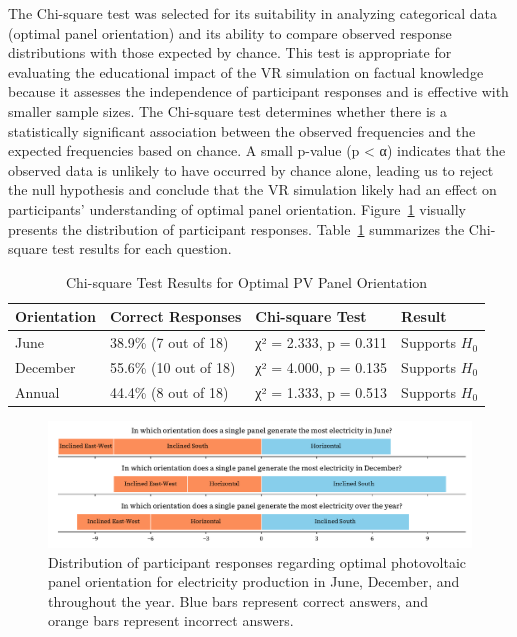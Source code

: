\documentclass[draft, final]{vutinfth} %
\begin{document}
The Chi-square test was selected for its suitability in analyzing categorical data (optimal panel orientation) and its ability to compare observed response distributions with those expected by chance. This test is appropriate for evaluating the educational impact of the VR simulation on factual knowledge because it assesses the independence of participant responses and is effective with smaller sample sizes. The Chi-square test determines whether there is a statistically significant association between the observed frequencies and the expected frequencies based on chance. A small p-value (p < α) indicates that the observed data is unlikely to have occurred by chance alone, leading us to reject the null hypothesis and conclude that the VR simulation likely had an effect on participants' understanding of optimal panel orientation.
Figure~\ref{fig:research-3} visually presents the distribution of participant responses. Table~\ref{tab:chi-square-results} summarizes the Chi-square test results for each question.

\begin{table}[h]
    \centering
    \begin{tabular}{llll}
    \toprule
    \textbf{Orientation} & \textbf{Correct Responses} & \textbf{Chi-square Test} & \textbf{Result} \\
    \midrule
    June & 38.9\% (7 out of 18) & χ² = 2.333, p = 0.311 & Supports $H_0$ \\
    December & 55.6\% (10 out of 18) & χ² = 4.000, p = 0.135 & Supports $H_0$ \\
    Annual & 44.4\% (8 out of 18) & χ² = 1.333, p = 0.513 & Supports $H_0$ \\
    \bottomrule
    \end{tabular}
    \caption{Chi-square Test Results for Optimal PV Panel Orientation}
    \label{tab:chi-square-results}
\end{table}

\begin{figure}[]
    \centering
    \includegraphics[width=\textwidth]{graphics/research-3.pdf}
    \caption{Distribution of participant responses regarding optimal photovoltaic panel orientation for electricity production in June, December, and throughout the year. Blue bars represent correct answers, and orange bars represent incorrect answers.}
    \label{fig:research-3}
\end{figure}
\end{document}

